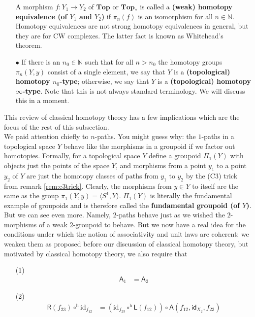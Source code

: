 \begin{enumerate}
A morphism $f \colon Y_{1} \rightarrow Y_{2}$ of $\mathbf{Top}$ or $\mathbf{Top}_{\ast}$ is called a \textbf{(weak) homotopy equivalence (of $Y_{1}$ and $Y_{2}$)} if $\pi_{n}(f)$ is an isomorphism for all $n \in \mathbb{N}$.
Homotopy equivalences are not strong homotopy equivalences in general, but they are for CW complexes.
The latter fact is known as Whitehead's theorem.
\item[$\bullet$]
If there is an $n_{0} \in \mathbb{N}$ such that for all $n > n_{0}$ the homotopy groups $\pi_{n}(Y,y)$ consist of a single element, we say that $Y$ is a \textbf{(topological) homotopy $n_{0}$-type}; otherwise, we say that $Y$ is a \textbf{(topological) homotopy $\infty$-type}.
Note that this is not always standard terminology.
We will discuss this in a moment.
\end{enumerate}
This review of classical homotopy theory has a few implications which are the focus of the rest of this subsection.
\\
We paid attention chiefly to $n$-paths.
You might guess why: the $1$-paths in a topological space $Y$ behave like the morphisms in a groupoid if we factor out homotopies.
Formally, for a topological space $Y$ define a groupoid $\Pi_{1}(Y)$ with objects just the points of the space $Y$, and morphisms from a point $y_{1}$ to a point $y_{2}$ of $Y$ are just the homotopy classes of paths from $y_{1}$ to $y_{2}$ by the (C3) trick from remark \ref{rem:c3trick}.
Clearly, the morphisms from $y \in Y$ to itself are the same as the group $\pi_{1}(Y,y) = \langle S^{1},Y \rangle$.
$\Pi_{1}(Y)$ is literally the fundamental example of groupoids and is therefore called the \textbf{fundamental groupoid (of $Y$)}.
But we can see even more.
Namely, $2$-paths behave just as we wished the $2$-morphisms of a weak $2$-groupoid to behave.
But we now have a real idea for the conditions under which the notion of associativity and unit laws are {\glqq}coherent{\grqq}: we weaken them as proposed before our discussion of classical homotopy theory, but motivated by classical homotopy theory, we also require that
\begin{enumerate}
\item[(1)]
\begin{align*}
  \mathsf{A}_{1}
  &=
  \mathsf{A}_{2}
\end{align*}
\item[(2)]
\begin{align*}
  \mathsf{R}(f_{23})
  \circ^{\textrm{h}}
  \mathrm{id}_{f_{12}}
  &=
  \left(
    \mathrm{id}_{f_{23}}
    \circ^{\textrm{h}}
    \mathsf{L}(f_{12})
  \right)
  \circ
  \mathsf{A}(f_{12},\mathsf{id}_{X_{2}},f_{23})
\end{align*}
\end{enumerate}
